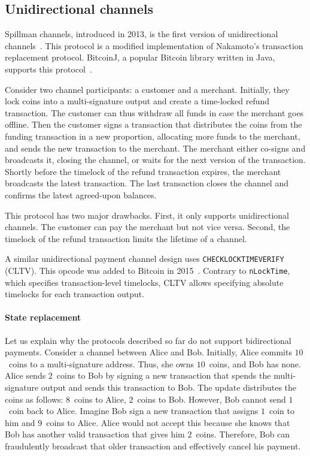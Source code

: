 \subsection{Unidirectional channels}

Spillman channels, introduced in 2013, is the first version of unidirectional channels~\cite{Spillman2013}.
This protocol is a modified implementation of Nakamoto's transaction replacement protocol.
BitcoinJ, a popular Bitcoin library written in Java, supports this protocol~\cite{BitcoinJ}.

Consider two channel participants: a customer and a merchant.
Initially, they lock coins into a multi-signature output and create a time-locked refund transaction.
The customer can thus withdraw all funds in case the merchant goes offline.
Then the customer signs a transaction that distributes the coins from the funding transaction in a new proportion, allocating more funds to the merchant, and sends the new transaction to the merchant.
The merchant either co-signs and broadcasts it, closing the channel, or waits for the next version of the transaction.
Shortly before the timelock of the refund transaction expires, the merchant broadcasts the latest transaction.
The last transaction closes the channel and confirms the latest agreed-upon balances.

This protocol has two major drawbacks.
First, it only supports unidirectional channels.
The customer can pay the merchant but not vice versa.
Second, the timelock of the refund transaction limits the lifetime of a channel.

A similar unidirectional payment channel design uses \texttt{CHECKLOCKTIMEVERIFY} (CLTV).
This opcode was added to Bitcoin in 2015~\cite{Todd2014}.
Contrary to \texttt{nLockTime}, which specifies transaction-level timelocks, CLTV allows specifying absolute timelocks for each transaction output.

\paragraph{State replacement}

Let us explain why the protocols described so far do not support bidirectional payments.
Consider a channel between Alice and Bob.
Initially, Alice commits $10$~coins to a multi-signature address.
Thus, she owns $10$~coins, and Bob has none.
Alice sends $2$~coins to Bob by signing a new transaction that spends the multi-signature output and sends this transaction to Bob.
The update distributes the coins as follows: $8$~coins to Alice, $2$~coins to Bob.
However, Bob cannot send $1$~coin back to Alice.
Imagine Bob sign a new transaction that assigns $1$~coin to him and $9$~coins to Alice.
Alice would not accept this because she knows that Bob has another valid transaction that gives him $2$~coins.
Therefore, Bob can fraudulently broadcast that older transaction and effectively cancel his payment.

